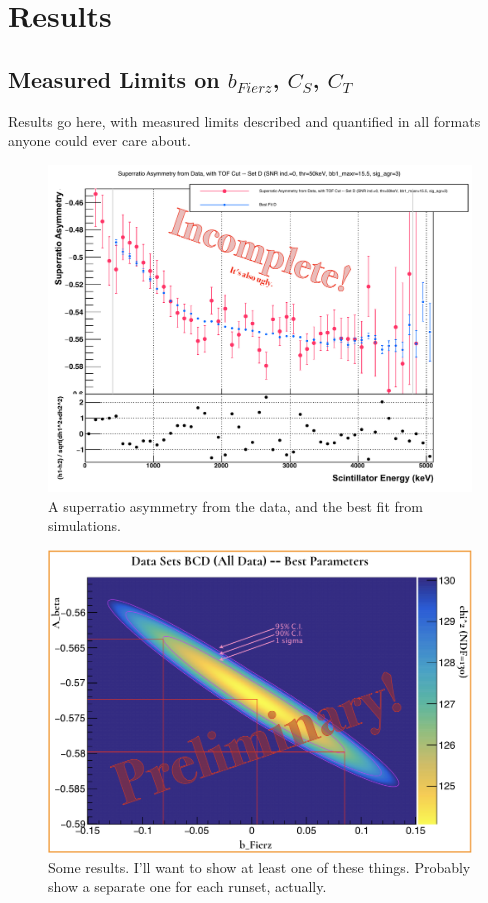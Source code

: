 


\clearpage	
\chapter{Results}
\label{results_chapter}

\section{Measured Limits on $b_{Fierz}$, $C_S$, $C_T$}
	Results go here, with measured limits described and quantified in all formats anyone could ever care about.
	
\begin{figure}[h!!!t]
	\centering
	\includegraphics[width=.999\linewidth]
	{Figures/AsymmetryAndResiduals.pdf}
	\caption{A superratio asymmetry from the data, and the best fit from simulations.}	
	\label{fig:asymmetry}
\end{figure}
	
	
\begin{figure}[h!!!t]
	\centering
	\includegraphics[width=.999\linewidth]
	{Figures/Abeta_bFierz_2D_prelim.png}
	\caption{Some results.  I'll want to show at least one of these things.  Probably show a separate one for each runset, actually.}	
	\label{fig:2d_results_bcd}
\end{figure}

